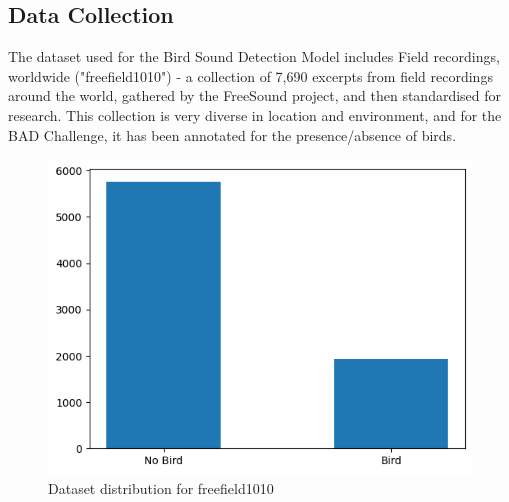       \subsection{Data Collection}
      The dataset used for the Bird Sound Detection Model includes Field recordings, worldwide ("freefield1010") - a collection of 7,690 excerpts from field recordings around the world, gathered by the FreeSound project, and then standardised for research. This collection is very diverse in location and environment, and for the BAD Challenge, it has been annotated for the presence/absence of birds.
      \begin{figure}[h!]
            \centering
            \includegraphics[scale=0.75]{images/dataset_detection-1.png}
            \caption{Dataset distribution for freefield1010}
            \label{fig:freefield1010 dataset}
      \end{figure}
      
